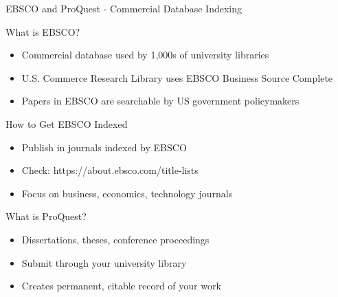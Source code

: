 \documentclass[11pt]{beamer}
\begin{document}
				\begin{frame}{EBSCO and ProQuest - Commercial Database Indexing}
					\scriptsize
					\begin{block}{What is EBSCO?}
						\begin{itemize}
							\item Commercial database used by 1,000s of university libraries
							\item U.S. Commerce Research Library uses EBSCO Business Source Complete
							\item Papers in EBSCO are searchable by US government policymakers
						\end{itemize}
					\end{block}
					\begin{block}{How to Get EBSCO Indexed}
						\begin{itemize}
							\item Publish in journals indexed by EBSCO
							\item Check: https://about.ebsco.com/title-lists
							\item Focus on business, economics, technology journals
						\end{itemize}
					\end{block}
					\begin{block}{What is ProQuest?}
						\begin{itemize}
							\item Dissertations, theses, conference proceedings
							\item Submit through your university library
							\item Creates permanent, citable record of your work
						\end{itemize}
					\end{block}
				\end{frame}
				
\end{document}
